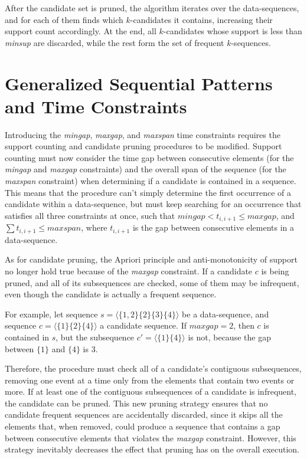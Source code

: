After the candidate set is pruned, the algorithm iterates over the data-sequences, and for each of them finds which $k$-candidates it contains, increasing their support count accordingly. At the end, all $k$-candidates whose support is less than \textit{minsup} are discarded, while the rest form the set of frequent $k$-sequences.

\section{Generalized Sequential Patterns and Time Constraints}

Introducing the \textit{mingap}, \textit{maxgap}, and \textit{maxspan} time constraints requires the support counting and candidate pruning procedures to be modified. Support counting must now consider the time gap between consecutive elements (for the \textit{mingap} and \textit{maxgap} constraints) and the overall span of the sequence (for the \textit{maxspan} constraint) when determining if a candidate is contained in a sequence. This means that the procedure can't simply determine the first occurrence of a candidate within a data-sequence, but must keep searching for an occurrence that satisfies all three constraints at once, such that $\textit{mingap} < t_{i,i+1} \leq \textit{maxgap}$, and $\sum t_{i,i+1} \leq \textit{maxspan}$, where $t_{i,i+1}$ is the gap between consecutive elements in a data-sequence.

As for candidate pruning, the Apriori principle and anti-monotonicity of support no longer hold true because of the \textit{maxgap} constraint. If a candidate $c$ is being pruned, and all of its subsequences are checked, some of them may be infrequent, even though the candidate is actually a frequent sequence.

For example, let sequence $s = \langle \{1, 2\} \{2\} \{3\} \{4\} \rangle$ be a data-sequence, and sequence $c = \langle \{1\} \{2\} \{4\} \rangle$ a candidate sequence. If $\textit{maxgap} = 2$, then $c$ is contained in $s$, but the subsequence $c' = \langle \{1\} \{4\} \rangle$ is not, because the gap between $\{1\}$ and $\{4\}$ is $3$.

Therefore, the procedure must check all of a candidate's contiguous subsequences, removing one event at a time only from the elements that contain two events or more. If at least one of the contiguous subsequences of a candidate is infrequent, the candidate can be pruned. This new pruning strategy ensures that no candidate frequent sequences are accidentally discarded, since it skips all the elements that, when removed, could produce a sequence that contains a gap between consecutive elements that violates the \textit{maxgap} constraint. However, this strategy inevitably decreases the effect that pruning has on the overall execution.
